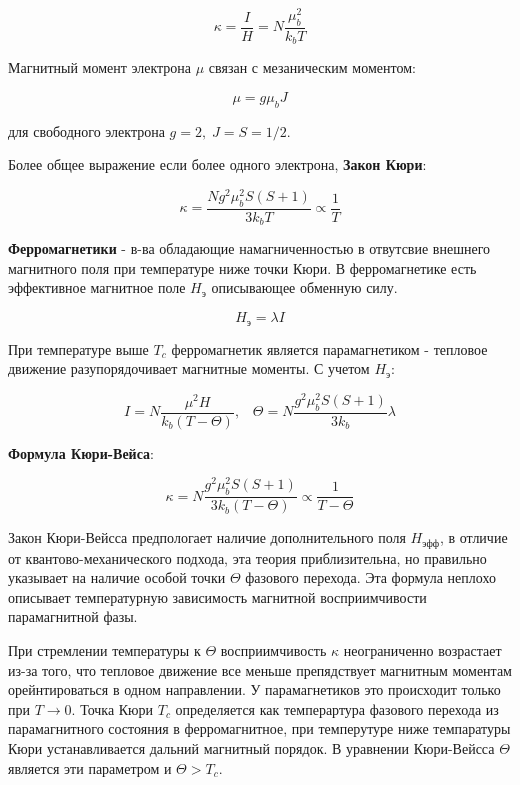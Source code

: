 \documentclass[a4paper]{article}
\begin{document}
\begin{equation}
    \kappa = \frac{I}{H} = N \frac{\mu_b^2}{k_b T}
\end{equation}

Магнитный момент электрона $\mu$ связан с мезаническим моментом: 

\begin{equation}
    \mu = g \mu_b J
\end{equation}

для свободного электрона $g = 2, \; J = S = 1/2$.

Более общее выражение если более одного электрона, \textbf{Закон Кюри}:

\begin{equation}
    \kappa = \frac{N g^2 \mu_b^2 S(S+1)}{3 k_b T} \propto \frac{1}{T}
\end{equation}


\textbf{Ферромагнетики} - в-ва обладающие намагниченностью в отвутсвие внешнего магнитного поля при температуре ниже точки Кюри.
В ферромагнетике есть эффективное магнитное поле $H_э$ описывающее обменную силу. 

\begin{equation}
    H_э = \lambda I
\end{equation}

При температуре выше $T_c$ ферромагнетик является парамагнетиком - тепловое движение разупорядочивает магнитные моменты.
С учетом $H_э$:

\begin{equation}
    I = N \frac{\mu^2 H}{k_b(T - \Theta)}, \;\;\; \Theta = N\frac{g^2 \mu_b^2 S(S+1)}{3 k_b} \lambda
\end{equation}

\textbf{Формула Кюри-Вейса}:

\begin{equation}
    \kappa = N \frac{g^2 \mu_b^2 S(S+1)}{3 k_b (T - \Theta)} \propto \frac{1}{T - \Theta}
\end{equation}

Закон Кюри-Вейсса предпологает наличие дополнительного поля $H_{эфф}$, в отличие от квантово-механического подхода, эта теория приблизительна, но 
правильно указывает на наличие особой точки $\Theta$ фазового перехода. Эта формула неплохо описывает температурную зависимость магнитной восприимчивости парамагнитной фазы.
\par 
При стремлении температуры к $\Theta$ восприимчивость $\kappa$ неограниченно возрастает из-за того, что тепловое движение все меньше препядствует магнитным моментам орейнтироваться в одном направлении.
У парамагнетиков это происходит только при $T \rightarrow 0$. Точка Кюри $T_c$ определяется как темперартура фазового перехода из парамагнитного состояния в ферромагнитное, при темперутуре ниже темпаратуры Кюри 
устанавливается дальний магнитный порядок. В уравнении Кюри-Вейсса $\Theta $ является эти параметром и $\Theta > T_c$.
\end{document}
